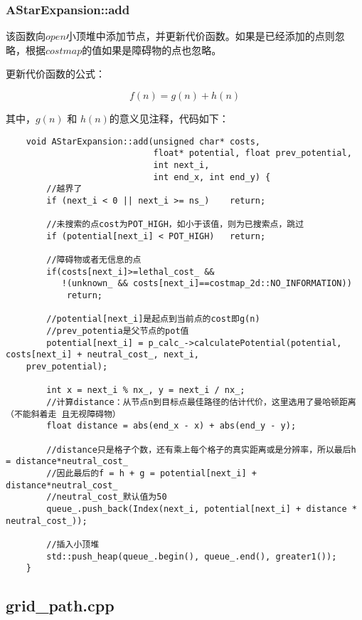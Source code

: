 \documentclass[9pt, oneside]{book}
\begin{document}
\subsubsection{AStarExpansion::add}

该函数向$open$小顶堆中添加节点，并更新代价函数。如果是已经添加的点则忽略，根据$costmap$的值如果是障碍物的点也忽略。

更新代价函数的公式：

\begin{equation}
    f(n) = g(n) + h(n)
\end{equation}

其中，$g(n)$ 和 $h(n)$的意义见注释，代码如下：

\footnotesize
\begin{verbatim}
    void AStarExpansion::add(unsigned char* costs, 
                             float* potential, float prev_potential, 
                             int next_i, 
                             int end_x, int end_y) {
        //越界了
        if (next_i < 0 || next_i >= ns_)    return;

        //未搜索的点cost为POT_HIGH，如小于该值，则为已搜索点，跳过
        if (potential[next_i] < POT_HIGH)   return;

        //障碍物或者无信息的点
        if(costs[next_i]>=lethal_cost_ && 
           !(unknown_ && costs[next_i]==costmap_2d::NO_INFORMATION))
            return;
        
        //potential[next_i]是起点到当前点的cost即g(n)
        //prev_potentia是父节点的pot值
        potential[next_i] = p_calc_->calculatePotential(potential, costs[next_i] + neutral_cost_, next_i, 
    prev_potential);

        int x = next_i % nx_, y = next_i / nx_;
        //计算distance：从节点n到目标点最佳路径的估计代价，这里选用了曼哈顿距离（不能斜着走 且无视障碍物）
        float distance = abs(end_x - x) + abs(end_y - y);

        //distance只是格子个数，还有乘上每个格子的真实距离或是分辨率，所以最后h = distance*neutral_cost_
        //因此最后的f = h + g = potential[next_i] + distance*neutral_cost_
        //neutral_cost_默认值为50
        queue_.push_back(Index(next_i, potential[next_i] + distance * neutral_cost_));

        //插入小顶堆
        std::push_heap(queue_.begin(), queue_.end(), greater1());
    }
\end{verbatim}
\normalsize

\subsection{grid\_path.cpp}
\end{document}
